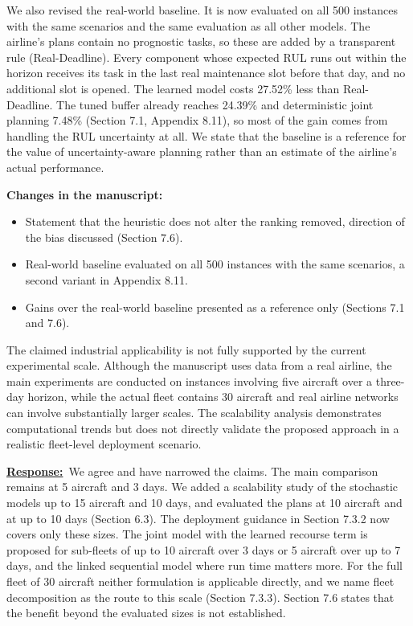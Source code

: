 \documentclass{article}
\newcommand{\response}{\vspace{0.1cm}\noindent\underline{\textbf{Response:}}\ }
\newcommand{\changes}{\vspace{0.1cm}\noindent\textbf{Changes in the manuscript:}}
\begin{document}
We also revised the real-world baseline. It is now evaluated on all 500 instances with the same scenarios and the same evaluation as all other models. The airline's plans contain no prognostic tasks, so these are added by a transparent rule (Real-Deadline). Every component whose expected RUL runs out within the horizon receives its task in the last real maintenance slot before that day, and no additional slot is opened. The learned model costs 27.52\% less than Real-Deadline. The tuned buffer already reaches 24.39\% and deterministic joint planning 7.48\% (Section 7.1, Appendix 8.11), so most of the gain comes from handling the RUL uncertainty at all. We state that the baseline is a reference for the value of uncertainty-aware planning rather than an estimate of the airline's actual performance.

\changes
\begin{itemize}[nosep]
\item Statement that the heuristic does not alter the ranking removed, direction of the bias discussed (Section 7.6).
\item Real-world baseline evaluated on all 500 instances with the same scenarios, a second variant in Appendix 8.11.
\item Gains over the real-world baseline presented as a reference only (Sections 7.1 and 7.6).
\end{itemize}

\begin{cmt}{}{}
The claimed industrial applicability is not fully supported by the current experimental scale. Although the manuscript uses data from a real airline, the main experiments are conducted on instances involving five aircraft over a three-day horizon, while the actual fleet contains 30 aircraft and real airline networks can involve substantially larger scales. The scalability analysis demonstrates computational trends but does not directly validate the proposed approach in a realistic fleet-level deployment scenario.
\end{cmt}

\response We agree and have narrowed the claims. The main comparison remains at 5 aircraft and 3 days. We added a scalability study of the stochastic models up to 15 aircraft and 10 days, and evaluated the plans at 10 aircraft and at up to 10 days (Section 6.3). The deployment guidance in Section 7.3.2 now covers only these sizes. The joint model with the learned recourse term is proposed for sub-fleets of up to 10 aircraft over 3 days or 5 aircraft over up to 7 days, and the linked sequential model where run time matters more. For the full fleet of 30 aircraft neither formulation is applicable directly, and we name fleet decomposition as the route to this scale (Section 7.3.3). Section 7.6 states that the benefit beyond the evaluated sizes is not established.
\end{document}
